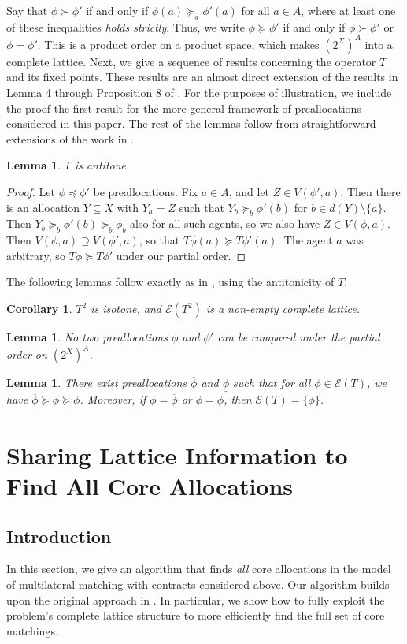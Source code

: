 \documentclass[11pt,reqno]{amsart}
\newtheorem{lemma}[thm]{Lemma}
\newtheorem{cor}[thm]{Corollary}
\theoremstyle{definition}
\numberwithin{equation}{section}
\newcommand{\prf}{\begin{proof}}
\newcommand{\eprf}{\end{proof}}
\newcommand{\ol}{\overline}
\newcommand{\ul}{\underline}
\newcommand{\pre}{\phi}
\newcommand{\prealloc}{(2^X)^A}
\newcommand{\sub}{\subseteq}
\newcommand{\fix}{\mathcal{E}}
\newcommand{\suq}{\succeq}
\newcommand{\peq}{\preceq}
\newcommand{\su}{\succ}
\begin{document}
Say that $\pre \su \pre'$ if and only if $\pre(a) \suq_a \pre'(a)$ for all $a \in A$, where at least one of these inequalities \emph{holds strictly}. 
Thus, we write $\pre \suq \pre'$ if and only if $\pre \su \pre'$ or $\pre = \pre'$. 
This is a product order on a product space, which makes $\prealloc$ into a complete lattice. 
Next, we give a sequence of results concerning the operator $T$ and its fixed points. 
These results are an almost direct extension of the results in Lemma 4 through Proposition 8 of \cite{EcheniqueYenmez2013}.
For the purposes of illustration, we include the proof the first result for the more general framework of preallocations considered in this paper.
The rest of the lemmas follow from straightforward extensions of the work in \cite{EcheniqueYenmez2013}. 
\begin{lemma} \label{lemma:antitone}
$T$ is antitone 
\end{lemma}
\prf
Let $\pre \peq \pre'$ be preallocations.
Fix $a \in A$, and let $Z \in V(\pre',a)$.
Then there is an allocation $Y \sub X$ with $Y_a = Z$ such that $Y_b \suq_b \pre'(b)$ for $b \in d(Y) \setminus \{a\}$.
Then $Y_b \suq_b \pre'(b) \suq_b \pre_b$ also for all such agents, so we also have $Z \in V(\pre,a)$.
Then $V(\pre,a) \supseteq V(\pre',a)$, so that $T\pre(a) \suq T\pre'(a)$. The agent $a$ was arbitrary, so $T\pre \suq T\pre'$ under our partial order. 
\eprf
The following lemmas follow exactly as in \cite{EcheniqueYenmez2013}, using the antitonicity of $T$. 
\begin{cor} $T^2$ is isotone, and $\fix(T^2)$ is a non-empty complete lattice. 
\end{cor}
\begin{lemma} \label{lemma:order}
No two preallocations $\pre$ and $\pre'$ can be compared under the partial order on $\prealloc$.
\end{lemma}
\begin{lemma} \label{lemma:top}
There exist preallocations $\ol{\pre}$ and $\ul{\pre}$ such that for all $\pre \in \fix(T)$, we have $\ol{\pre} \suq \pre \suq \ul{\pre}$. Moreover, if $\pre = \ol{\pre}$ or $\pre = \ul{\pre}$, then $\fix(T) = \{\pre\}$. 
\end{lemma}

\section{Sharing Lattice Information to Find All Core Allocations}
\subsection{Introduction}
In this section, we give an algorithm that finds \emph{all} core allocations in the model of multilateral matching with contracts considered above.
Our algorithm builds upon the original approach in \cite{EcheniqueYenmez2013}.
In particular, we show how to fully exploit the problem's complete lattice structure to more efficiently find the full set of core matchings. 
\end{document}
